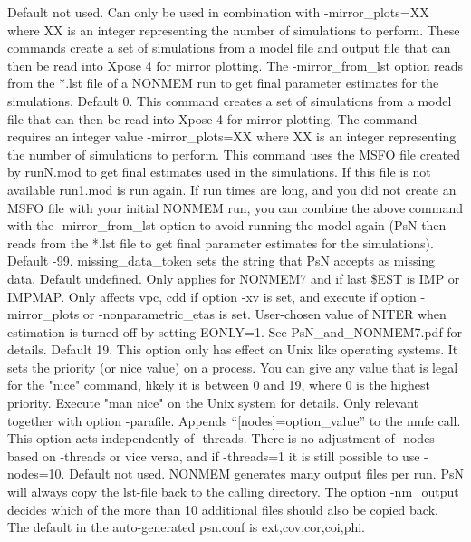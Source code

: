 \begin{optionlist}
\nextopt
{}
Default not used. Can only be used in combination with -mirror\_plots=XX where XX is an integer representing the number of simulations to perform.  These commands create a set of simulations from a model file and output file that can then be read into Xpose 4 for mirror plotting.  The -mirror\_from\_lst option reads from the *.lst file of a NONMEM run to get final parameter estimates for the simulations. 
\nextopt
{}
Default 0. This command creates a set of simulations from a model file that can then be read into Xpose 4 for mirror plotting. The command requires an integer value -mirror\_plots=XX where XX is an integer representing the number of simulations to perform. This command uses the MSFO file created by runN.mod to get final estimates used in the simulations. If this file is not available run1.mod is run again.  If run times are long, and you did not create an MSFO file with your initial NONMEM run, you can combine the above command with the -mirror\_from\_lst option to avoid running the model again (PsN then reads from the *.lst file to get final parameter estimates for the simulations). 
\nextopt
{}
Default -99. missing\_data\_token sets the string that PsN accepts as missing data. 
\nextopt
{}
Default undefined. Only applies for NONMEM7 and if last \$EST is IMP or IMPMAP. Only affects vpc,  cdd if option -xv is set, and execute if option -mirror\_plots or -nonparametric\_etas is set. User-chosen value of NITER when estimation is turned off by setting EONLY=1. See PsN\_and\_NONMEM7.pdf for details. 
\nextopt
{}
Default 19. This option only has effect on Unix like operating systems. It  sets the priority (or nice value) on a process. You can give any value that is legal for the "nice" command, likely it is between 0 and 19, where 0 is the highest priority. Execute "man nice" on the Unix system for details. 
\nextopt
{}
Only relevant together with option -parafile. Appends “[nodes]=option\_value” to the nmfe call. This option acts independently of -threads. There is no adjustment of -nodes based on -threads or vice versa, and if -threads=1 it is still possible to use -nodes=10. 
\nextopt
{}
Default not used.  NONMEM generates many output files per run. 
PsN will always copy the lst-file back to the calling directory. The option -nm\_output decides which of the more than 10 additional files should also be copied back. The default in the auto-generated psn.conf is ext,cov,cor,coi,phi. 

\end{optionlist}
